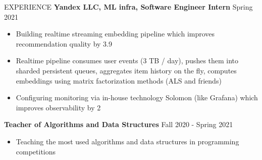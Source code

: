 \documentclass{resume} %
\begin{document}
\begin{rSection}{EXPERIENCE}
\textbf{Yandex LLC, ML infra, Software Engineer Intern} \hfill Spring 2021 
\begin{itemize}
    \item Building realtime streaming embedding pipeline which improves recommendation quality by 3.9%
    \item Realtime pipeline consumes user events (3 TB / day), pushes them into sharded persistent queues, aggregates item history on the fly, computes embeddings using matrix factorization methods (ALS and friends)
    \item Configuring monitoring via in-house technology Solomon (like Grafana) which improves observability by 2%
\end{itemize}
\textbf{Teacher of Algorithms and Data Structures} \hfill Fall 2020 - Spring 2021
\begin{itemize}
    \item Teaching the most used algorithms and data structures in programming competitions %
\end{itemize}
 

\end{rSection} 
\end{document}
